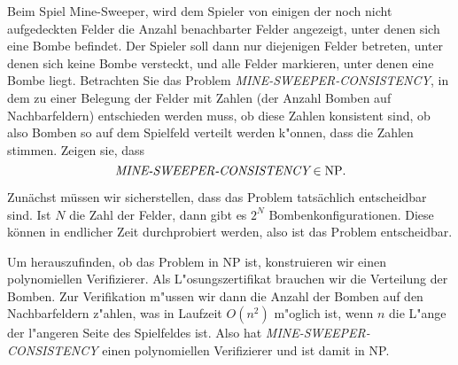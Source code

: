 Beim Spiel Mine-Sweeper, wird dem Spieler von einigen der noch nicht
aufgedeckten Felder die Anzahl benachbarter Felder angezeigt, unter
denen sich eine Bombe befindet. Der Spieler soll dann nur diejenigen
Felder betreten, unter denen sich keine Bombe versteckt, und alle
Felder markieren, unter denen eine Bombe liegt. Betrachten Sie das
Problem {\it MINE-SWEEPER-CONSISTENCY}, in dem zu einer Belegung der
Felder mit Zahlen (der Anzahl Bomben auf Nachbarfeldern) entschieden
werden muss, ob diese Zahlen konsistent sind, ob also Bomben so
auf dem Spielfeld verteilt werden k"onnen, dass die Zahlen stimmen.
Zeigen sie, dass
\[
\text{\it MINE-SWEEPER-CONSISTENCY}\in \text{NP}.
\]

\begin{loesung}
Zunächst müssen wir sicherstellen, dass das Problem tatsächlich
entscheidbar sind.
Ist $N$ die Zahl der Felder, dann gibt es $2^N$ Bombenkonfigurationen.
Diese können in endlicher Zeit durchprobiert werden, also ist das
Problem entscheidbar.

Um herauszufinden, ob das Problem in NP ist, konstruieren wir
einen polynomiellen Verifizierer.
Als L"osungszertifikat brauchen wir die Verteilung der Bomben.
Zur Verifikation m"ussen wir dann die Anzahl der Bomben auf den
Nachbarfeldern z"ahlen, was in Laufzeit $O(n^2)$ m"oglich ist,
wenn $n$ die L"ange der l"angeren Seite des Spielfeldes ist.
Also hat
{\it MINE-SWEEPER-CONSISTENCY} einen polynomiellen Verifizierer und
ist damit in NP.
\end{loesung}
